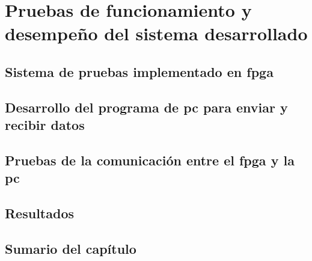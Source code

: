 \chapter{Pruebas de funcionamiento y desempeño del sistema desarrollado}
	\label{cap:verif}
	
%		
	\section{Sistema de pruebas implementado en \acrshort{fpga}}
		
	\section{Desarrollo del programa de \acrshort{pc} para enviar y recibir datos}
			
	\section{Pruebas de la comunicación entre el \acrshort{fpga} y la \acrshort{pc}}
		
	\section{Resultados}
		
	\section{Sumario del capítulo}
		
